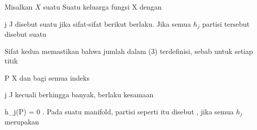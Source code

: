 {}
{

Misalkan $X$ suatu
Suatu keluarga fungsi
 { X } {\R
} {}
dengan

\mavergleichskette
{\vergleichskette
{ j
}
{ \in }{ J
}
{  }{
}
{    }{
}
{   }{
}
}
{}{}{}
disebut suatu  jika sifat-sifat berikut berlaku.
 Jika semua $h_j$  partisi tersebut disebut suatu 

}

Sifat kedua memastikan bahwa jumlah dalam (3) terdefinisi, sebab untuk setiap titik

\mavergleichskette
{\vergleichskette
{ P
}
{ \in }{ X
}
{  }{
}
{    }{
}
{   }{
}
}
{}{}{}
dan bagi semua indeks

\mavergleichskette
{\vergleichskette
{ j
}
{ \in }{ J
}
{  }{
}
{    }{
}
{   }{
}
}
{}{}{}
kecuali berhingga banyak, berlaku kesamaan

\mavergleichskette
{\vergleichskette
{  h_j(P)
}
{ = }{ 0
}
{  }{
}
{    }{
}
{   }{
}
}
{}{}{.}
Pada suatu manifold, partisi seperti itu disebut  {,} jika semua $h_j$ merupakan

